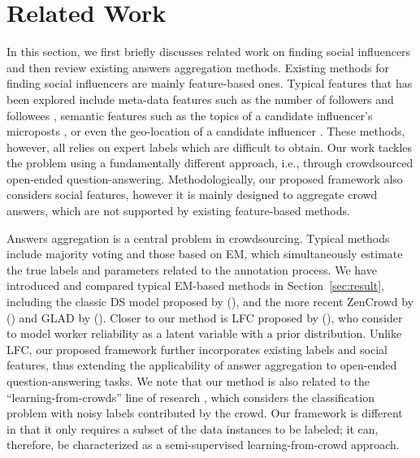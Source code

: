 \section{Related Work}

In this section, we first briefly discusses related work on finding social influencers and then review existing answers aggregation methods. Existing methods for finding social influencers are mainly feature-based ones. Typical features that has been explored include meta-data features such as the number of followers and followees \cite{Lehmann2013,Cheng2014}, semantic features such as the topics of a candidate influencer's microposts \cite{riahi2012finding,wei2016learning}, or even the geo-location of a candidate influencer \cite{Cheng2014} . These methods, however, all relies on expert labels which are difficult to obtain. Our work tackles the problem using a fundamentally different approach, i.e., through crowdsourced open-ended question-answering. Methodologically, our proposed framework also considers social features, however it is mainly designed to aggregate crowd answers, which are not supported by existing feature-based methods.


Answers aggregation is a central problem in crowdsourcing. Typical methods include majority voting \cite{sheng2008get} and those based on EM, which simultaneously estimate the true labels and parameters related to the annotation process. We have introduced and compared typical EM-based methods in Section~\ref{sec:result}, including the classic DS model proposed by \citeauthor{dawid1979maximum} (\citeyear{dawid1979maximum}), and the more recent ZenCrowd by \citeauthor{demartini2012zencrowd} (\citeyear{demartini2012zencrowd}) and GLAD by \citeauthor{whitehill2009whose} (\citeyear{whitehill2009whose}). Closer to our method is LFC proposed by \citeauthor{raykar2010learning} (\citeyear{raykar2010learning}), who consider to model worker reliability as a latent variable with a prior distribution. Unlike LFC, our proposed framework further incorporates existing labels and social features, thus extending the applicability of answer aggregation to open-ended question-answering tasks. We note that our method is also related to the ``learning-from-crowds'' line of research \cite{raykar2010learning,tian2012learning,yang2018leveraging}, which considers the classification problem with noisy labels contributed by the crowd. Our framework is different in that it only requires a subset of the data instances to be labeled; it can, therefore, be characterized as a semi-supervised learning-from-crowd approach. 